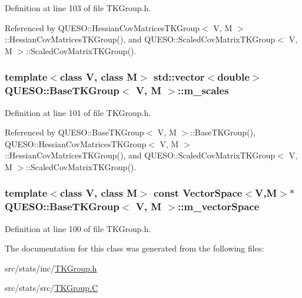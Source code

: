 Definition at line 103 of file T\-K\-Group.\-h.



Referenced by Q\-U\-E\-S\-O\-::\-Hessian\-Cov\-Matrices\-T\-K\-Group$<$ V, M $>$\-::\-Hessian\-Cov\-Matrices\-T\-K\-Group(), and Q\-U\-E\-S\-O\-::\-Scaled\-Cov\-Matrix\-T\-K\-Group$<$ V, M $>$\-::\-Scaled\-Cov\-Matrix\-T\-K\-Group().

\hypertarget{class_q_u_e_s_o_1_1_base_t_k_group_ad36d4dc6f4812e3e10d8090f0dbb9e40}{
\subsubsection[{m\-\_\-scales}]{\setlength{\rightskip}{0pt plus 5cm}template$<$class V, class M$>$ std\-::vector$<$double$>$ {\bf Q\-U\-E\-S\-O\-::\-Base\-T\-K\-Group}$<$ V, M $>$\-::m\-\_\-scales\hspace{0.3cm}{\ttfamily [protected]}}}\label{class_q_u_e_s_o_1_1_base_t_k_group_ad36d4dc6f4812e3e10d8090f0dbb9e40}


Definition at line 101 of file T\-K\-Group.\-h.



Referenced by Q\-U\-E\-S\-O\-::\-Base\-T\-K\-Group$<$ V, M $>$\-::\-Base\-T\-K\-Group(), Q\-U\-E\-S\-O\-::\-Hessian\-Cov\-Matrices\-T\-K\-Group$<$ V, M $>$\-::\-Hessian\-Cov\-Matrices\-T\-K\-Group(), and Q\-U\-E\-S\-O\-::\-Scaled\-Cov\-Matrix\-T\-K\-Group$<$ V, M $>$\-::\-Scaled\-Cov\-Matrix\-T\-K\-Group().

\hypertarget{class_q_u_e_s_o_1_1_base_t_k_group_a9930bbda0f3d9368653fb0577b89ec33}{
\subsubsection[{m\-\_\-vector\-Space}]{\setlength{\rightskip}{0pt plus 5cm}template$<$class V, class M$>$ const {\bf Vector\-Space}$<$V,M$>$$\ast$ {\bf Q\-U\-E\-S\-O\-::\-Base\-T\-K\-Group}$<$ V, M $>$\-::m\-\_\-vector\-Space\hspace{0.3cm}{\ttfamily [protected]}}}\label{class_q_u_e_s_o_1_1_base_t_k_group_a9930bbda0f3d9368653fb0577b89ec33}


Definition at line 100 of file T\-K\-Group.\-h.



The documentation for this class was generated from the following files\-:\begin{DoxyCompactItemize}
\item 
src/stats/inc/\hyperlink{_t_k_group_8h}{T\-K\-Group.\-h}\item 
src/stats/src/\hyperlink{_t_k_group_8_c}{T\-K\-Group.\-C}\end{DoxyCompactItemize}

